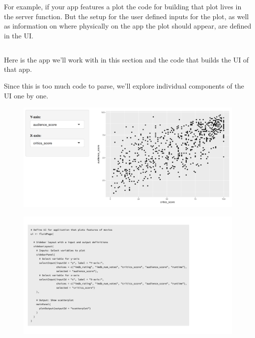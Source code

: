 \documentclass[
  letterpaper,
  DIV=11,
  numbers=noendperiod]{scrreprt}
\begin{document}
For example, if your app features a plot the code for building that plot
lives in the server function. But the setup for the user defined inputs
for the plot, as well as information on where physically on the app the
plot should appear, are defined in the UI.

\hypertarget{section-1}{%
\subsection{}\label{section-1}}

Here is the app we'll work with in this section and the code that builds
the UI of that app.

Since this is too much code to parse, we'll explore individual
components of the UI one by one.

\begin{figure}

{\centering \includegraphics[width=1\textwidth,height=\textheight]{./images/app-selectinput-scatterplot.png}

}

\end{figure}

\begin{figure}

{\centering \includegraphics[width=1\textwidth,height=\textheight]{./images/ui-selectinput-scatterplot.png}

}

\end{figure}
\end{document}
